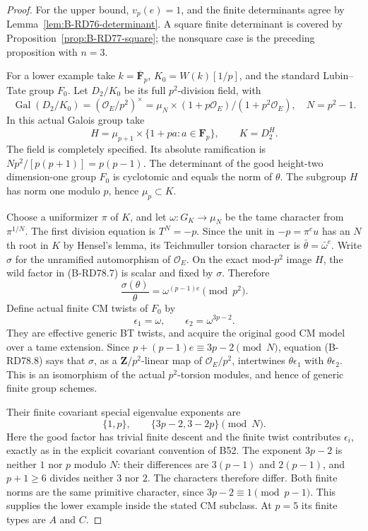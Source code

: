 \begin{proof}
For the upper bound, \(v_p(e)=1\), and the finite determinants
agree by Lemma~\ref{lem:B-RD76-determinant}. A square finite
determinant is covered by Proposition~\ref{prop:B-RD77-square};
the nonsquare case is the preceding proposition with \(n=3\).

For a lower example take \(k=\overline{\mathbf F}_p\),
\(K_0=W(k)[1/p]\), and the standard Lubin--Tate group \(F_0\).
Let \(D_2/K_0\) be its full \(p^2\)-division field, with
\[
 \operatorname{Gal}(D_2/K_0)
 = (\mathcal O_E/p^2)^\times
 =\mu_N\times(1+p\mathcal O_E)/(1+p^2\mathcal O_E),
 \quad N=p^2-1.
                                                        \tag{B-RD78.6}
\]
In this actual Galois group take
\[
 H=\mu_{p+1}\times
       \{1+pa:a\in\mathbf F_p\},\qquad K=D_2^H.
                                                        \tag{B-RD78.7}
\]
The field is completely specified. Its absolute ramification is
\(Np^2/[p(p+1)]=p(p-1)\). The determinant of the good
height-two dimension-one group \(F_0\) is cyclotomic and equals
the norm of \(\theta\). The subgroup \(H\) has norm one
modulo \(p\), hence \(\mu_p\subset K\).

Choose a uniformizer \(\pi\) of \(K\), and let
\(\omega:G_K\to\mu_N\) be the tame character from
\(\pi^{1/N}\). The first division equation is \(T^N=-p\).
Since the unit in \(-p=\pi^e u\) has an \(N\)th root in
\(K\) by Hensel's lemma, its Teichmuller torsion character is
\(\bar\theta=\bar\omega^e\). Write \(\sigma\) for the
unramified automorphism of \(\mathcal O_E\).
On the exact mod-\(p^2\) image \(H\), the wild factor in
(B-RD78.7) is scalar and fixed by \(\sigma\). Therefore
\[
 \frac{\sigma(\theta)}{\theta}
       =\omega^{(p-1)e}\pmod{p^2}.
                                                        \tag{B-RD78.8}
\]
Define actual finite CM twists of \(F_0\) by
\[
 \epsilon_1=\omega,\qquad
 \epsilon_2=\omega^{3p-2}.
                                                        \tag{B-RD78.9}
\]
They are effective generic BT twists, and acquire the original
good CM model over a tame extension. Since
\(p+(p-1)e\equiv3p-2\pmod N\), equation (B-RD78.8) says
that \(\sigma\), as a \(\mathbf Z/p^2\)-linear map of
\(\mathcal O_E/p^2\), intertwines
\(\theta\epsilon_1\) with \(\theta\epsilon_2\).
This is an isomorphism of the actual \(p^2\)-torsion modules,
and hence of generic finite group schemes.

Their finite covariant special eigenvalue exponents are
\[
                 \{1,p\},\qquad \{3p-2,3-2p\}
                 \pmod N.                            \tag{B-RD78.10}
\]
Here the good factor has trivial finite descent and the finite
twist contributes \(\epsilon_i\), exactly as in the explicit
covariant convention of B52. The exponent \(3p-2\) is neither
\(1\) nor \(p\) modulo \(N\): their differences are
\(3(p-1)\) and \(2(p-1)\), and \(p+1\ge6\) divides
neither \(3\) nor \(2\). The characters therefore differ.
Both finite norms are the same primitive character, since
\(3p-2\equiv1\pmod{p-1}\). This supplies the lower example
inside the stated CM subclass. At \(p=5\) its finite types
are \(A\) and \(C\).
\end{proof}

